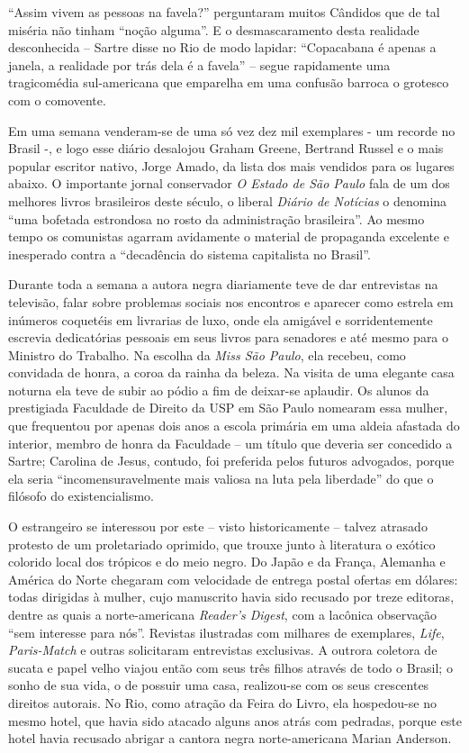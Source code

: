 \documentclass[
  letterpaper,
  DIV=11,
  numbers=noendperiod]{scrreprt}
\begin{document}
``Assim vivem as pessoas na favela?'' perguntaram muitos Cândidos que de
tal miséria não tinham ``noção alguma''. E o desmascaramento desta
realidade desconhecida -- Sartre disse no Rio de modo lapidar:
``Copacabana é apenas a janela, a realidade por trás dela é a favela''
-- segue rapidamente uma tragicomédia sul-americana que emparelha em uma
confusão barroca o grotesco com o comovente.

Em uma semana venderam-se de uma só vez dez mil exemplares - um recorde
no Brasil -, e logo esse diário desalojou Graham Greene, Bertrand Russel
e o mais popular escritor nativo, Jorge Amado, da lista dos mais
vendidos para os lugares abaixo. O importante jornal conservador \emph{O
Estado de São Paulo} fala de um dos melhores livros brasileiros deste
século, o liberal \emph{Diário de Notícias} o denomina ``uma bofetada
estrondosa no rosto da administração brasileira''. Ao mesmo tempo os
comunistas agarram avidamente o material de propaganda excelente e
inesperado contra a ``decadência do sistema capitalista no Brasil''.

Durante toda a semana a autora negra diariamente teve de dar entrevistas
na televisão, falar sobre problemas sociais nos encontros e aparecer
como estrela em inúmeros coquetéis em livrarias de luxo, onde ela
amigável e sorridentemente escrevia dedicatórias pessoais em seus livros
para senadores e até mesmo para o Ministro do Trabalho. Na escolha da
\emph{Miss São Paulo}, ela recebeu, como convidada de honra, a coroa da
rainha da beleza. Na visita de uma elegante casa noturna ela teve de
subir ao pódio a fim de deixar-se aplaudir. Os alunos da prestigiada
Faculdade de Direito da USP em São Paulo nomearam essa mulher, que
frequentou por apenas dois anos a escola primária em uma aldeia afastada
do interior, membro de honra da Faculdade -- um título que deveria ser
concedido a Sartre; Carolina de Jesus, contudo, foi preferida pelos
futuros advogados, porque ela seria ``incomensuravelmente mais valiosa
na luta pela liberdade'' do que o filósofo do existencialismo.

O estrangeiro se interessou por este -- visto historicamente -- talvez
atrasado protesto de um proletariado oprimido, que trouxe junto à
literatura o exótico colorido local dos trópicos e do meio negro. Do
Japão e da França, Alemanha e América do Norte chegaram com velocidade
de entrega postal ofertas em dólares: todas dirigidas à mulher, cujo
manuscrito havia sido recusado por treze editoras, dentre as quais a
norte-americana \emph{Reader's Digest}, com a lacônica observação ``sem
interesse para nós''. Revistas ilustradas com milhares de exemplares,
\emph{Life}, \emph{Paris-Match} e outras solicitaram entrevistas
exclusivas. A outrora coletora de sucata e papel velho viajou então com
seus três filhos através de todo o Brasil; o sonho de sua vida, o de
possuir uma casa, realizou-se com os seus crescentes direitos autorais.
No Rio, como atração da Feira do Livro, ela hospedou-se no mesmo hotel,
que havia sido atacado alguns anos atrás com pedradas, porque este hotel
havia recusado abrigar a cantora negra norte-americana Marian Anderson.
\end{document}
